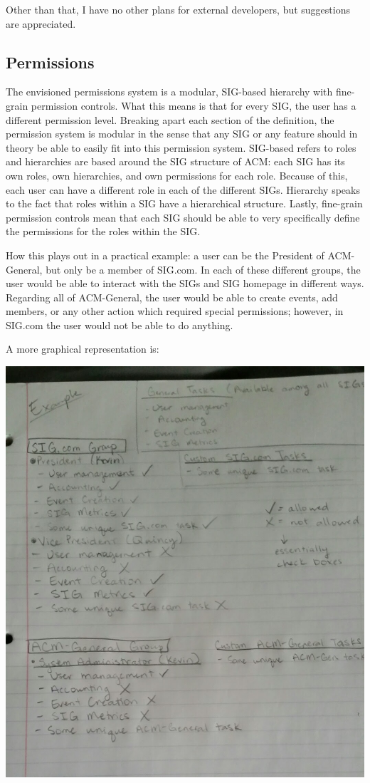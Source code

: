 \documentclass{article}
\begin{document}
Other than that, I have no other plans for external developers, but suggestions
are appreciated. 

\subsection{Permissions}
The envisioned permissions system is a modular, SIG-based hierarchy with 
fine-grain permission controls. What this means is that for every SIG, the
user has a different permission level. Breaking apart each section of the 
definition, the permission system is modular in the sense that any SIG
or any feature should in theory be able to easily fit into this permission
system. SIG-based refers to roles and hierarchies are based around the SIG 
structure of ACM: each SIG has its own roles, own hierarchies, and own permissions
for each role. Because of this, each user can have a different role in each of the
different SIGs. Hierarchy speaks to the fact that roles within a SIG have
a hierarchical structure. Lastly, fine-grain permission controls mean that
each SIG should be able to very specifically define the permissions for the
roles within the SIG.

How this plays out in a practical example: a user can be the President of ACM-General,
but only be a member of SIG.com. In each of these different groups, the user would
be able to interact with the SIGs and SIG homepage in different ways. Regarding
all of ACM-General, the user would be able to create events, add members, or any
other action which required special permissions; however, in SIG.com the user
would not be able to do anything.

A more graphical representation is:

\includegraphics[width=\textwidth,height=\textheight,keepaspectratio]{figures/permissions.jpg}
\end{document}
